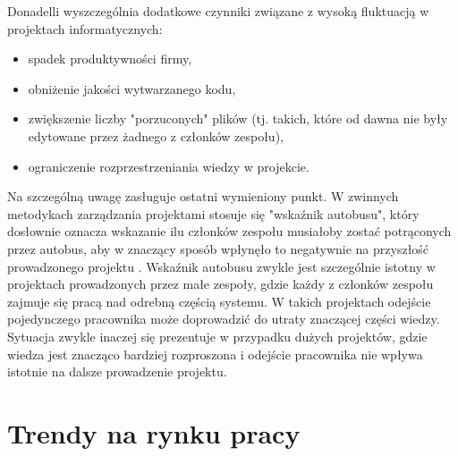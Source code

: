 Donadelli \cite{donadelli-2015} wyszczególnia dodatkowe czynniki związane z wysoką fluktuacją w projektach informatycznych:
\begin{itemize}
    \item spadek produktywności firmy,
    \item obniżenie jakości wytwarzanego kodu,
    \item zwiększenie liczby "porzuconych" plików (tj. takich, które od dawna nie były edytowane przez żadnego z członków zespołu),
    \item ograniczenie rozprzestrzeniania wiedzy w projekcie.
    \end{itemize}

Na szczególną uwagę zasługuje ostatni wymieniony punkt.
W zwinnych metodykach zarządzania projektami stosuje się "wskaźnik autobusu", który dosłownie oznacza wskazanie ilu członków zespołu musiałoby zostać potrąconych przez autobus, aby w znaczący sposób wpłynęło to negatywnie na przyszłość prowadzonego projektu \cite{https://www.agileadvice.com/2005/05/15/agilemanagement/truck-factor/}.
Wskaźnik autobusu zwykle jest szczególnie istotny w projektach prowadzonych przez małe zespoły, gdzie każdy z członków zespołu zajmuje się pracą nad odrebną częścią systemu.
W takich projektach odejście pojedynczego pracownika może doprowadzić do utraty znaczącej części wiedzy.
Sytuacja zwykle inaczej się prezentuje w przypadku dużych projektów, gdzie wiedza jest znacząco bardziej rozproszona i odejście pracownika nie wpływa istotnie na dalsze prowadzenie projektu.

%
%


%
%

\section{Trendy na rynku pracy}

